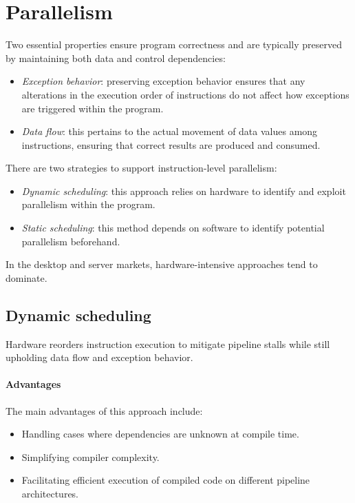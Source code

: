 \section{Parallelism}

Two essential properties ensure program correctness and are typically preserved by maintaining both data and control dependencies:
\begin{itemize}
    \item \textit{Exception behavior}: preserving exception behavior ensures that any alterations in the execution order of instructions do not affect how exceptions are triggered within the program.
    \item \textit{Data flow}: this pertains to the actual movement of data values among instructions, ensuring that correct results are produced and consumed.
\end{itemize}
There are two strategies to support instruction-level parallelism:
\begin{itemize}
    \item \textit{Dynamic scheduling}: this approach relies on hardware to identify and exploit parallelism within the program.
    \item \textit{Static scheduling}: this method depends on software to identify potential parallelism beforehand.
\end{itemize}
In the desktop and server markets, hardware-intensive approaches tend to dominate.

\subsection{Dynamic scheduling}
Hardware reorders instruction execution to mitigate pipeline stalls while still upholding data flow and exception behavior.

\paragraph*{Advantages}
The main advantages of this approach include:
\begin{itemize}
    \item Handling cases where dependencies are unknown at compile time.
    \item Simplifying compiler complexity.
    \item Facilitating efficient execution of compiled code on different pipeline architectures.
\end{itemize}

